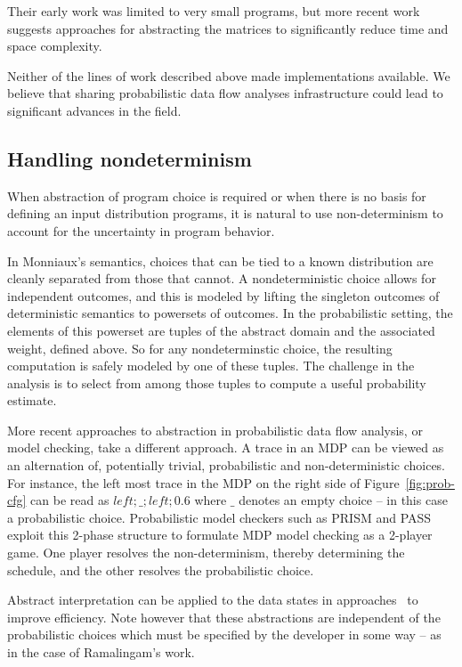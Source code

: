 Their early work was limited to very small programs, but more recent
work suggests approaches for abstracting the matrices to significantly
reduce time and space complexity.   

Neither of the lines of work described above made implementations
available.  We believe that sharing probabilistic data flow analyses
infrastructure could lead to significant advances in the field.

\subsection{Handling nondeterminism}
When abstraction of program choice is required or when 
there is no basis for defining an input distribution programs,
it is natural to use non-determinism to account for the uncertainty
in program behavior.

In Monniaux's semantics\cite{MonniauxMDP}, choices that can be tied to a known
distribution are cleanly separated from those that cannot.
A nondeterministic choice allows for independent outcomes, and
this is modeled by lifting the singleton outcomes of deterministic
semantics to powersets of outcomes.
In the probabilistic setting, the elements of this powerset are
tuples of the abstract domain and the associated weight, defined
above.  So for any nondeterminstic choice, the resulting computation 
is safely modeled by one of these tuples.  The challenge in the
analysis is to select from among those tuples to compute a useful
probability estimate.

More recent approaches to abstraction in probabilistic data flow
analysis, or model checking, take a different approach.
A trace in an MDP can be viewed as an alternation of, potentially trivial,
probabilistic and non-deterministic choices.  For instance, the
left most trace in the MDP on the right side of Figure~\ref{fig:prob-cfg}
can be read as $\mathit{left};\_;\mathit{left};0.6$ where $\_$ 
denotes an empty choice -- in this case a probabilistic choice.
Probabilistic model checkers such as PRISM and PASS exploit this
2-phase structure to formulate MDP model checking as a 2-player
game.  One player resolves the non-determinism, thereby determining
the schedule, and the other resolves the probabilistic choice.

Abstract interpretation can be applied to the data states in
approaches~\cite{PRISMabstraction,wachter2010best,esparza2011probabilistic}
to improve efficiency.  Note however that these abstractions are
independent of the probabilistic choices which must be specified
by the developer in some way -- as in the case of Ramalingam's work.

